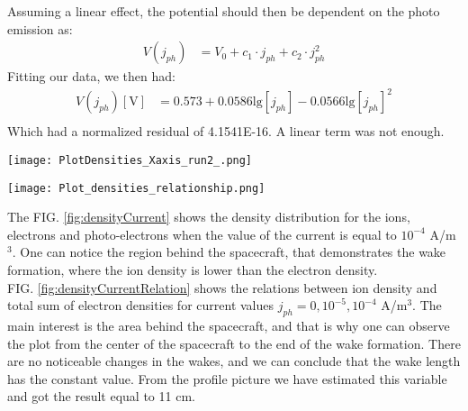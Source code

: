 \documentclass[aip, 
rsi, 
amsmath,
amssymb,
longbibliography,
reprint]{revtex4-1}
\begin{document}
Assuming a linear effect, the potential should then be dependent on the photo emission as:
\begin{align*}
V\left(j_{ph}\right) &= V_0 + c_1\cdot j_{ph} + c_2\cdot j_{ph}^2
\end{align*}
Fitting our data, we then had:
\begin{align*}
V\left(j_{ph}\right) \left[\text{V}\right]&= 0.573 + 0.0586 \text{lg}\left[j_{ph}\right] - 0.0566 \text{lg}\left[j_{ph}\right]^2\\
\end{align*}
Which had a normalized residual of 4.1541E-16. A linear term was not enough.\\

\begin{figure*}
\texttt{[image: PlotDensities\_Xaxis\_run2\_.png]}
\caption{\label{fig:densityCurrent}Plot of densities of electrons, photo-electrons and ions, labels as rhoe, rhop and rhoe respectively, when the current value is \(j_{ph} = 10^{-4}\) A/m$^3$. We are plotting from the center of the spacecraft on the same side as the wake.}
\end{figure*}

\begin{figure*}
\texttt{[image: Plot\_densities\_relationship.png]}
\caption{\label{fig:densityCurrentRelation}Relation between ion and total electron density for different photo-emission currents, labeled as $j_{ph}$, distributed from the center of the spacecraft and along the flow direction.}
\end{figure*}

The FIG. \ref{fig:densityCurrent} shows the density distribution for the ions, electrons and photo-electrons when the value of the current is equal to $10^{-4}$ A/m$^3$. One can notice the region behind the spacecraft, that demonstrates the wake formation, where the ion density is lower than the electron density.\\

FIG. \ref{fig:densityCurrentRelation} shows the relations between ion density and total sum of electron densities for current values $j_{ph}=0, 10^{-5}, 10^{-4}$ A/m$^3$. The main interest is the area behind the spacecraft, and that is why one can observe the plot from the center of the spacecraft to the end of the wake formation. There are no noticeable changes in the wakes, and we can conclude that the wake length has the constant value. From the profile picture we have estimated this variable and got the result equal to 11 cm.\\
\end{document}
